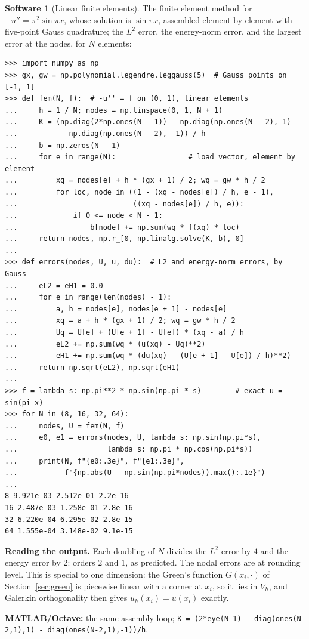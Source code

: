 \documentclass[11pt,a4paper]{article}
\numberwithin{equation}{section}
\theoremstyle{definition}
\newtheorem{software}[thm]{Software}
\begin{document}
\begin{software}[Linear finite elements]
\label{sw:fem}
The finite element method for $-u'' = \pi^2\sin\pi x$, whose solution is $\sin\pi x$, assembled element by element with five-point Gauss quadrature; the $L^2$ error, the energy-norm error, and the largest error at the nodes, for $N$ elements:
{\small\begin{verbatim}
>>> import numpy as np
>>> gx, gw = np.polynomial.legendre.leggauss(5)  # Gauss points on [-1, 1]
>>> def fem(N, f):  # -u'' = f on (0, 1), linear elements
...     h = 1 / N; nodes = np.linspace(0, 1, N + 1)
...     K = (np.diag(2*np.ones(N - 1)) - np.diag(np.ones(N - 2), 1)
...          - np.diag(np.ones(N - 2), -1)) / h
...     b = np.zeros(N - 1)
...     for e in range(N):                 # load vector, element by element
...         xq = nodes[e] + h * (gx + 1) / 2; wq = gw * h / 2
...         for loc, node in ((1 - (xq - nodes[e]) / h, e - 1),
...                           ((xq - nodes[e]) / h, e)):
...             if 0 <= node < N - 1:
...                 b[node] += np.sum(wq * f(xq) * loc)
...     return nodes, np.r_[0, np.linalg.solve(K, b), 0]
...
>>> def errors(nodes, U, u, du):  # L2 and energy-norm errors, by Gauss
...     eL2 = eH1 = 0.0
...     for e in range(len(nodes) - 1):
...         a, h = nodes[e], nodes[e + 1] - nodes[e]
...         xq = a + h * (gx + 1) / 2; wq = gw * h / 2
...         Uq = U[e] + (U[e + 1] - U[e]) * (xq - a) / h
...         eL2 += np.sum(wq * (u(xq) - Uq)**2)
...         eH1 += np.sum(wq * (du(xq) - (U[e + 1] - U[e]) / h)**2)
...     return np.sqrt(eL2), np.sqrt(eH1)
...
>>> f = lambda s: np.pi**2 * np.sin(np.pi * s)        # exact u = sin(pi x)
>>> for N in (8, 16, 32, 64):
...     nodes, U = fem(N, f)
...     e0, e1 = errors(nodes, U, lambda s: np.sin(np.pi*s),
...                     lambda s: np.pi * np.cos(np.pi*s))
...     print(N, f"{e0:.3e}", f"{e1:.3e}",
...           f"{np.abs(U - np.sin(np.pi*nodes)).max():.1e}")
...
8 9.921e-03 2.512e-01 2.2e-16
16 2.487e-03 1.258e-01 2.8e-16
32 6.220e-04 6.295e-02 2.8e-15
64 1.555e-04 3.148e-02 9.1e-15
\end{verbatim}}
\textbf{Reading the output.} Each doubling of $N$ divides the $L^2$ error by $4$ and the energy error by $2$: orders $2$ and $1$, as predicted. The nodal errors are at rounding level. This is special to one dimension: the Green's function $G(x_i, \cdot)$ of Section~\ref{sec:green} is piecewise linear with a corner at $x_i$, so it lies in
$V_h$, and Galerkin orthogonality then gives $u_h(x_i) = u(x_i)$ exactly.

\textbf{MATLAB/Octave:} the same assembly loop; \texttt{K = (2*eye(N-1) - diag(ones(N-2,1),1) - diag(ones(N-2,1),-1))/h}.
\end{software}
\end{document}

